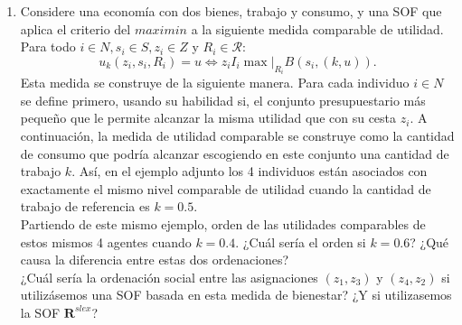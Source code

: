 \begin{enumerate}
\begin{center}
	\end{center}
	\vspace{.5cm}

    \item Considere una economía con dos bienes, trabajo y consumo, y una SOF que aplica el criterio del $maximin$ a la siguiente medida comparable de utilidad. Para todo $i \in N, s_i \in S, z_i \in Z$ y $R_i \in \mathcal{R}$:
	$$u_k(z_i , s_i , R_i) = u \Leftrightarrow z_i I_i \max |_{R_i} B(s_i ,(k, u)).$$ 
	Esta medida se construye de la siguiente manera. Para cada individuo $i \in N$ se define primero, usando su habilidad si, el conjunto presupuestario más pequeño que le permite alcanzar la misma utilidad que con su cesta $z_i$. A continuación, la medida de utilidad comparable se construye como la cantidad de consumo que podría alcanzar escogiendo en este conjunto una cantidad de trabajo $k$. Así, en el ejemplo adjunto los 4 individuos están asociados con exactamente el mismo nivel comparable de utilidad cuando la cantidad de trabajo de referencia es $k = 0.5$. \\

	Partiendo de este mismo ejemplo, orden de las utilidades comparables de estos mismos 4 agentes cuando $k = 0.4$. ¿Cuál sería el orden si $k = 0.6$? ¿Qué causa la diferencia entre estas dos ordenaciones? \\

	¿Cuál sería la ordenación social entre las asignaciones $(z_1, z_3)$ y $(z_4, z_2)$ si utilizásemos una SOF basada en esta medida de bienestar? ¿Y si utilizasemos la SOF $\textbf{R}^{slex}$?\\


\end{enumerate}
